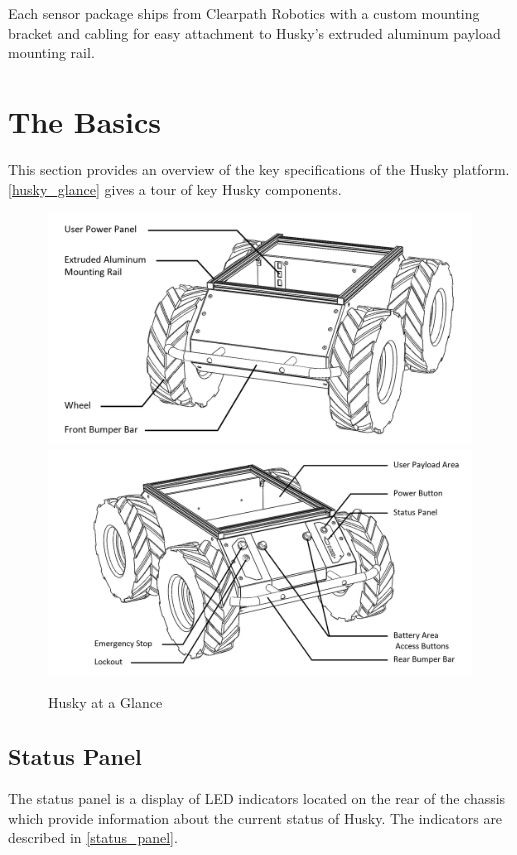 \documentclass[]{clearpath-latex/clearpath-manual}
\begin{document}
Each sensor package ships from Clearpath Robotics with a custom mounting bracket and cabling for easy attachment to Husky’s extruded aluminum payload mounting rail.


\section{The Basics}

This section provides an overview of the key specifications of the Husky platform. \autoref{husky_glance} gives a tour of key Husky components.


\begin{figure}[h]
  \centering
  \includegraphics[width=0.9\linewidth]{husky-front.PNG}
  \includegraphics[width=0.9\linewidth]{husky-rear.PNG}
  \caption{Husky at a Glance}
  \label{husky_glance}
\end{figure}
\newpage

\subsection{Status Panel}

The status panel is a display of LED indicators located on the rear of the chassis which 
provide information about the current status of Husky. The indicators are described in \autoref{status_panel}.
\end{document}

